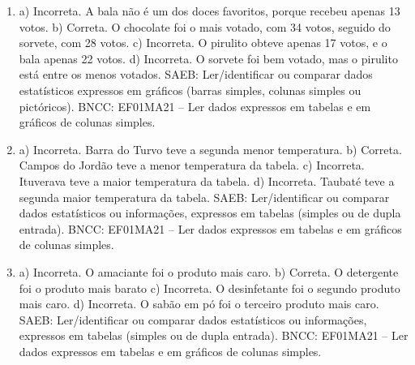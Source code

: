 \begin{enumerate}
\item
a) Incorreta. A bala não é um dos doces favoritos, porque recebeu apenas 13 votos.
b) Correta. O chocolate foi o mais votado, com 34 votos, seguido do sorvete, com 28 votos.
c) Incorreta. O pirulito obteve apenas 17 votos, e o bala apenas 22 votos.
d) Incorreta. O sorvete foi bem votado, mas o pirulito está entre os menos votados.
SAEB: Ler/identificar ou comparar dados estatísticos expressos
em gráficos (barras simples, colunas simples ou pictóricos).
BNCC: EF01MA21 -- Ler dados expressos em tabelas e em gráficos de colunas
simples.

\item
a) Incorreta. Barra do Turvo teve a segunda menor temperatura.
b) Correta. Campos do Jordão teve a menor temperatura da tabela.
c) Incorreta. Ituverava teve a maior temperatura da tabela.
d) Incorreta. Taubaté teve a segunda maior temperatura da tabela.
SAEB: Ler/identificar ou comparar dados estatísticos ou
informações, expressos em tabelas (simples ou de dupla entrada).
BNCC: EF01MA21 -- Ler dados expressos em tabelas e em gráficos de colunas
simples.

\item
a) Incorreta. O amaciante foi o produto mais caro.
b) Correta. O detergente foi o produto mais barato
c) Incorreta. O desinfetante foi o segundo produto mais caro.
d) Incorreta. O sabão em pó foi o terceiro produto mais caro.
SAEB: Ler/identificar ou comparar dados estatísticos ou
informações, expressos em tabelas (simples ou de dupla entrada).
BNCC: EF01MA21 -- Ler dados expressos em tabelas e em gráficos de colunas
simples.
\end{enumerate}


